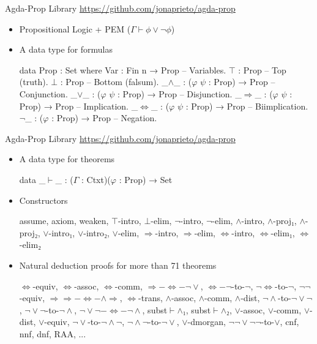 \documentclass[xetex, hyperref={pdfpagelabels=false}]{beamer}
\begin{document}
\begin{frame}[fragile, label=agda-prop-2]{Agda-Prop Library}
  {\url{https://github.com/jonaprieto/agda-prop}}
\begin{itemize}
  \item Propositional Logic + PEM ($Γ ⊢ ϕ ∨ ¬ ϕ$)
  \item A data type for formulas
\begin{agda}
data Prop : Set where
  Var  : Fin n → Prop           -- Variables.
  $⊤$    : Prop                   -- Top (truth).
  $⊥$    : Prop                   -- Bottom (falsum).
  _$∧$_  : ($φ$ $ψ$ : Prop) → Prop    -- Conjunction.
  _$∨$_  : ($φ$ $ψ$ : Prop) → Prop    -- Disjunction.
  _$⇒$_  : ($φ$ $ψ$ : Prop) → Prop    -- Implication.
  _$⇔$_  : ($φ$ $ψ$ : Prop) → Prop    -- Biimplication.
  $¬$_   : ($φ$ : Prop) → Prop      -- Negation.
\end{agda}
\end{itemize}
\end{frame}

\begin{frame}[fragile, label=agda-prop]{Agda-Prop Library}
  {\url{https://github.com/jonaprieto/agda-prop}}
\begin{itemize}
  \item A data type for theorems
\begin{agda}
data _$⊢$_ : ($Γ$ : Ctxt)($φ$ : Prop) → Set
\end{agda}

\item Constructors
\begin{agda}
assume, axiom, weaken, $⊤$-intro, $⊥$-elim, $¬$-intro,
$¬$-elim, $∧$-intro, $∧$-proj$₁$, $∧$-proj$₂$, $∨$-intro$₁$,
$∨$-intro$₂$, $∨$-elim, $⇒$-intro, $⇒$-elim, $⇔$-intro,
$⇔$-elim$₁$, $⇔$-elim$₂$
\end{agda}
  \item Natural deduction proofs for more than 71 theorems
\begin{agda}
$⇔$-equiv, $⇔$-assoc, $⇔$-comm, $⇒-⇔-¬∨$, $⇔-¬$-to-$¬$,
$¬⇔$-to-$¬$, $¬¬$-equiv, $⇒⇒-⇔-∧⇒$, $⇔$-trans, $∧$-assoc,
$∧$-comm, $∧$-dist, $¬∧$-to-$¬∨¬$, $¬∨¬$-to-$¬∧$, $¬∨¬-⇔-¬∧$,
subst$⊢∧₁$, subst$⊢∧₂$, $∨$-assoc, $∨$-comm, $∨$-dist,
$∨$-equiv, $¬∨$-to-$¬∧¬$, $¬∧¬$-to-$¬∨$, $∨$-dmorgan,
$¬¬∨¬¬$-to-$∨$, cnf, nnf, dnf, RAA, ...
\end{agda}
\end{itemize}
\end{frame}
\end{document}
